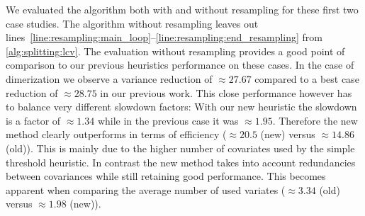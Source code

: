 We evaluated the algorithm both with and without resampling for these first two case studies.
The algorithm without resampling  leaves out lines~\ref{line:resampling:main_loop}--\ref{line:resampling:end_resampling} from \autoref{alg:splitting:lcv}.
The evaluation without resampling provides a good point of comparison to our previous heuristics performance on these cases.
In the case of dimerization we observe a variance reduction of $\approx 27.67$ compared to a best case reduction of $\approx 28.75$ in our previous work.
This close performance however has to balance very different slowdown factors: With our new heuristic the slowdown is a factor of $\approx 1.34$ while in the previous case it was $\approx 1.95$.
Therefore the new method clearly outperforms in terms of efficiency ($\approx 20.5$ (new) versus $\approx 14.86$ (old)).
This is mainly due to the higher number of covariates used by the simple threshold heuristic.
In contrast the new method takes into account redundancies between covariances while still retaining good performance.
This becomes apparent when comparing the average number of used variates ($\approx 3.34$ (old) versus $\approx 1.98$ (new)).

